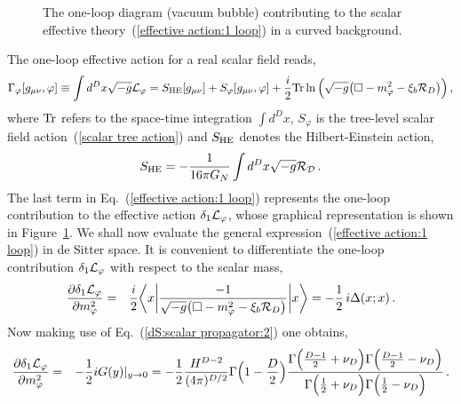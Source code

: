 \documentclass[aps,12pt,superscriptaddress,preprintnumbers,
                secnumarabic,nofootinbib,showpacs]{revtex4}
\newcommand{\lbfig}[1]{\refstepcounter{fig} \label{#1} }
\newcounter{fig}
\begin{document}
\begin{figure}[tbp]
\centerline{\hspace{.in}
}
\lbfig{figure 2}
\vskip -0.1in
\caption{\small
The one-loop diagram (vacuum bubble) contributing to the scalar effective
theory~(\ref{effective action:1 loop}) in a curved background.
}
\end{figure}
The one-loop effective action for a real scalar field reads,
\begin{equation}
 \Gamma_\varphi[g_{\mu\nu},\varphi] \equiv \int d^Dx \sqrt{-g}{\cal L}_\varphi
  = S_{\rm HE}[g_{\mu\nu}] + S_\varphi[g_{\mu\nu},\varphi]
   + \frac i2{\rm Tr}\ln\Big(
                          \sqrt{-g}\big(\Box - m_{\varphi}^2-\xi_b{\cal R}_D\big)
                        \Big)
\,,
\label{effective action:1 loop}
\end{equation}
where ${\rm Tr}$ refers to the space-time integration $\int d^Dx$,
$S_\varphi$ is the tree-level scalar field
action~(\ref{scalar tree action}) and $S_{\rm HE}$ denotes
the Hilbert-Einstein action,
\begin{equation}
 S_{\rm HE} = -\frac{1}{16\pi G_N} \int d^Dx \sqrt{-g}{\cal R_D}
\,.
\label{Hilbert-Einstein}
\end{equation}
The last term in Eq.~(\ref{effective action:1 loop}) represents
the one-loop contribution to the effective action $\delta_1 {\cal
L}_\varphi$, whose graphical representation is shown in
Figure~\ref{figure 2}.
 We shall now evaluate the general expression~(\ref{effective action:1 loop})
in de Sitter space. It is convenient to differentiate the
one-loop contribution $\delta_1 {\cal L}_\varphi$
with respect to the scalar mass,
\begin{eqnarray}
  \frac{\partial \delta_1{\cal L}_\varphi}{\partial m_\varphi^2} &=&
        \frac i2 \bigg\langle x\bigg|
               \frac{-1}{\sqrt{-g}\big(\Box - m_{\varphi}^2-\xi_b{\cal R}_D\big)}
            \bigg| x\bigg\rangle
        = -\frac12\, i{\Delta}(x;x)
\label{effective action:3} \,.
\end{eqnarray}
Now making use of Eq.~(\ref{dS:scalar propagator:2}) one obtains,
\begin{eqnarray}
  \frac{\partial \delta_1{\cal L}_\varphi}{\partial m_\varphi^2}
   &=& -\frac12 iG(y)|_{y\rightarrow 0}
      = -\frac12\frac{H^{D-2}}{(4\pi)^{D/2}}\Gamma\Big(1-\frac{D}{2}\Big)
           \frac{\Gamma\Big(\frac{D-1}{2}+\nu_D\Big)
                  \Gamma\Big(\frac{D-1}{2}-\nu_D\Big)}{\Gamma\Big(\frac{1}{2}+\nu_D\Big)
                    \Gamma\Big(\frac{1}{2}-\nu_D\Big)}
\,.
\label{effective action:scalars}
\end{eqnarray}
\end{document}
